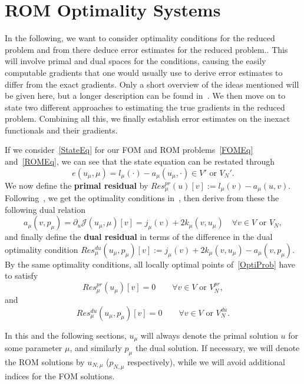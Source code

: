 \section{ROM Optimality Systems}

In the following, we want to consider optimality conditions for the reduced problem and from there deduce error estimates for the reduced problem..
This will involve primal and dual spaces for the conditions, causing the easily computable gradients that one would usually use to derive error estimates to differ from the exact gradients.
Only a short overview of the ideas mentioned will be given here, but a longer description can be found in~\cite[Section 3]{Keil2021}.
We then move on to state two different approaches to estimating the true gradients in the reduced problem.
Combining all this, we finally establish error estimates on the inexact functionals and their gradients.

If we consider~\eqref{StateEq} for our FOM and ROM problems~\eqref{FOMEq} and~\eqref{ROMEq}, we can see that the state equation can be restated through
\begin{equation*}
    e(u_\mu, \mu) = l_\mu(\cdot) - a_\mu(u_\mu, \cdot) \in V' \text{ or } V_N'.
\end{equation*}
We now define the \textbf{primal residual} by $Res_\mu^{pr}(u)[v] := l_\mu(v) - a_\mu(u, v)$.
Following~\cite[Corollary 1.3]{Hinze2009}, we get the optimality conditions in~\cite[Proposition 2.9]{Keil2021}, then derive from these the following dual relation
\begin{equation*}
    a_\mu(v, p_\mu) = \partial_u \mathcal{J}(u_\mu, \mu)[v] = j_\mu(v) + 2 k_\mu(v, u_\mu) \quad \forall v \in V \text{ or } V_N,
\end{equation*}
and finally define the \textbf{dual residual} in terms of the difference in the dual optimality condition $Res_\mu^{du}(u_\mu, p_\mu)[v] := j_\mu(v) + 2 k_\mu(v, u_\mu) - a_\mu(v, p_\mu)$.
By the same optimality conditions, all locally optimal points of~\eqref{OptiProb} have to satisfy
\begin{equation}\label{PrimalEq}
    Res_\mu^{pr}(u_\mu)[v] = 0 \qquad \forall v \in V \text{ or } V_N^{pr},
\end{equation}
and
\begin{equation}\label{DualEq}
    Res_\mu^{du}(u_\mu, p_\mu)[v] = 0 \qquad \forall v \in V \text{ or } V_N^{du}.
\end{equation}

In this and the following sections, $u_\mu$ will always denote the primal solution $u$ for some parameter $\mu$, and similarly $p_\mu$ the dual solution.
If necessary, we will denote the ROM solutions by $u_{N, \mu}$ ($p_{N, \mu}$ respectively), while we will avoid additional indices for the FOM solutions.

